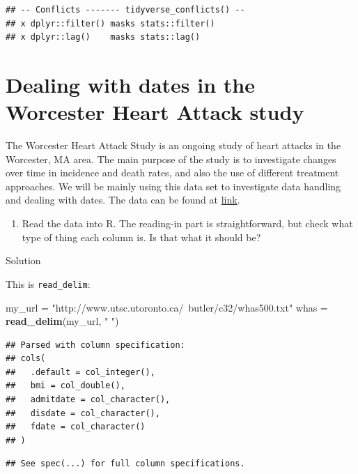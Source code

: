 \documentclass[]{tufte-book}
\newenvironment{Shaded}{}{}
\newcommand{\KeywordTok}[1]{\textcolor[rgb]{0.00,0.44,0.13}{\textbf{#1}}}
\newcommand{\NormalTok}[1]{#1}
\newcommand{\StringTok}[1]{\textcolor[rgb]{0.25,0.44,0.63}{#1}}
\providecommand{\tightlist}{%
  \setlength{\itemsep}{0pt}\setlength{\parskip}{0pt}}
\theoremstyle{definition}
\theoremstyle{definition}
\theoremstyle{definition}
\theoremstyle{remark}
\begin{document}
\begin{verbatim}
## -- Conflicts ------- tidyverse_conflicts() --
## x dplyr::filter() masks stats::filter()
## x dplyr::lag()    masks stats::lag()
\end{verbatim}

\hypertarget{dealing-with-dates-in-the-worcester-heart-attack-study}{%
\section{Dealing with dates in the Worcester Heart Attack
study}\label{dealing-with-dates-in-the-worcester-heart-attack-study}}

The Worcester Heart Attack Study is an ongoing study of heart attacks in
the Worcester, MA area. The main purpose of the study is to investigate
changes over time in incidence and death rates, and also the use of
different treatment approaches. We will be mainly using this data set to
investigate data handling and dealing with dates. The data can be found
at \href{http://www.utsc.utoronto.ca/~butler/c32/whas500.txt}{link}.

\begin{enumerate}
\def\labelenumi{(\alph{enumi})}
\tightlist
\item
  Read the data into R. The reading-in part is straightforward, but
  check what type of thing each column is. Is that what it should be?
\end{enumerate}

Solution

This is \texttt{read\_delim}:

\begin{Shaded}
\begin{Highlighting}[]
\NormalTok{my_url =}\StringTok{ "http://www.utsc.utoronto.ca/~butler/c32/whas500.txt"}
\NormalTok{whas =}\StringTok{ }\KeywordTok{read_delim}\NormalTok{(my_url, }\StringTok{" "}\NormalTok{)}
\end{Highlighting}
\end{Shaded}

\begin{verbatim}
## Parsed with column specification:
## cols(
##   .default = col_integer(),
##   bmi = col_double(),
##   admitdate = col_character(),
##   disdate = col_character(),
##   fdate = col_character()
## )
\end{verbatim}

\begin{verbatim}
## See spec(...) for full column specifications.
\end{verbatim}
\end{document}
